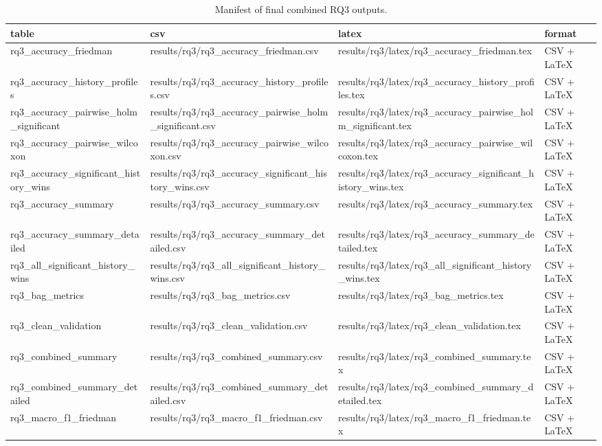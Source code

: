 \begin{table}[tbp]
\caption{Manifest of final combined RQ3 outputs.}
\label{tab:rq3-output-manifest}
\begin{tabular}{llll}
\toprule
table & csv & latex & format \\
\midrule
rq3\_accuracy\_friedman & results/rq3/rq3\_accuracy\_friedman.csv & results/rq3/latex/rq3\_accuracy\_friedman.tex & CSV + LaTeX \\
rq3\_accuracy\_history\_profiles & results/rq3/rq3\_accuracy\_history\_profiles.csv & results/rq3/latex/rq3\_accuracy\_history\_profiles.tex & CSV + LaTeX \\
rq3\_accuracy\_pairwise\_holm\_significant & results/rq3/rq3\_accuracy\_pairwise\_holm\_significant.csv & results/rq3/latex/rq3\_accuracy\_pairwise\_holm\_significant.tex & CSV + LaTeX \\
rq3\_accuracy\_pairwise\_wilcoxon & results/rq3/rq3\_accuracy\_pairwise\_wilcoxon.csv & results/rq3/latex/rq3\_accuracy\_pairwise\_wilcoxon.tex & CSV + LaTeX \\
rq3\_accuracy\_significant\_history\_wins & results/rq3/rq3\_accuracy\_significant\_history\_wins.csv & results/rq3/latex/rq3\_accuracy\_significant\_history\_wins.tex & CSV + LaTeX \\
rq3\_accuracy\_summary & results/rq3/rq3\_accuracy\_summary.csv & results/rq3/latex/rq3\_accuracy\_summary.tex & CSV + LaTeX \\
rq3\_accuracy\_summary\_detailed & results/rq3/rq3\_accuracy\_summary\_detailed.csv & results/rq3/latex/rq3\_accuracy\_summary\_detailed.tex & CSV + LaTeX \\
rq3\_all\_significant\_history\_wins & results/rq3/rq3\_all\_significant\_history\_wins.csv & results/rq3/latex/rq3\_all\_significant\_history\_wins.tex & CSV + LaTeX \\
rq3\_bag\_metrics & results/rq3/rq3\_bag\_metrics.csv & results/rq3/latex/rq3\_bag\_metrics.tex & CSV + LaTeX \\
rq3\_clean\_validation & results/rq3/rq3\_clean\_validation.csv & results/rq3/latex/rq3\_clean\_validation.tex & CSV + LaTeX \\
rq3\_combined\_summary & results/rq3/rq3\_combined\_summary.csv & results/rq3/latex/rq3\_combined\_summary.tex & CSV + LaTeX \\
rq3\_combined\_summary\_detailed & results/rq3/rq3\_combined\_summary\_detailed.csv & results/rq3/latex/rq3\_combined\_summary\_detailed.tex & CSV + LaTeX \\
rq3\_macro\_f1\_friedman & results/rq3/rq3\_macro\_f1\_friedman.csv & results/rq3/latex/rq3\_macro\_f1\_friedman.tex & CSV + LaTeX \\

\end{tabular}
\end{table}

